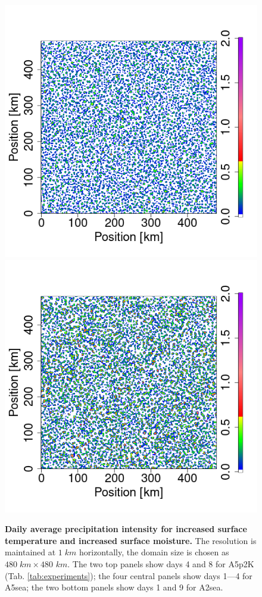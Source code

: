 \documentclass{article}
\begin{document}
\begin{figure}[ht]
\includegraphics[trim={2cm 2.4cm 1cm 1cm}, clip, height=0.11\linewidth]{var1_daymean_T0_300K_ampl_4_1km_RH100_1-144.png}
\hspace{1.55cm}
\hspace{1.55cm}
\hspace{1.55cm}
\hspace{1.55cm}
\hspace{1.55cm}
\hspace{1.55cm}
\hspace{1.55cm}
\includegraphics[trim={2cm 2.4cm 1cm 1cm}, clip, height=0.11\linewidth]{var1_daymean_T0_300K_ampl_4_1km_RH100_1153-1296.png}
\caption{{\bf Daily average precipitation intensity for increased surface temperature and increased surface moisture.} 
The resolution is maintained at $1\;km$ horizontally, the domain size is chosen as $480\;km\times 480$ $km$. The two top panels show days 4 and 8 for A5p2K (Tab. \ref{tab:experiments}); 
the four central panels show days 1---4 for A5sea;
the two bottom panels show days 1 and 9 for A2sea.}
\label{fig:daily_mean_increased_T_q}
\end{figure}
\end{document}
